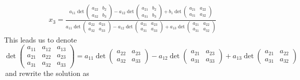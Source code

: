 $$\begin{aligned}
x_3 = \frac{a_{11} \operatorname{det} \begin{pmatrix} a_{22} & b_2 \\ a_{32} & b_3 \end{pmatrix} - a_{12} \operatorname{det} \begin{pmatrix} a_{21} & b_2 \\ a_{31} & b_3 \end{pmatrix} + b_1 \operatorname{det} \begin{pmatrix} a_{21} & a_{22} \\ a_{31} & a_{32} \end{pmatrix}}
           {a_{11} \operatorname{det} \begin{pmatrix} a_{22} & a_{23} \\ a_{32} & a_{33} \end{pmatrix} - a_{12} \operatorname{det} \begin{pmatrix} a_{21} & a_{23} \\ a_{31} & a_{33} \end{pmatrix} + a_{13} \operatorname{det} \begin{pmatrix} a_{21} & a_{22} \\ a_{31} & a_{32} \end{pmatrix}}
\end{aligned}$$
This leads us to denote 
$$\operatorname{det} \begin{pmatrix}
a_{11} & a_{12} & a_{13} \\
a_{21} & a_{22} & a_{23} \\
a_{31} & a_{32} & a_{33}
\end{pmatrix} = a_{11} \operatorname{det} \begin{pmatrix} 
a_{22} & a_{23} \\ 
a_{32} & a_{33} 
\end{pmatrix} - a_{12} \operatorname{det} \begin{pmatrix}
a_{21} & a_{23} \\
a_{31} & a_{33}
\end{pmatrix} + a_{13} \operatorname{det} \begin{pmatrix}
a_{21} & a_{22} \\
a_{31} & a_{32}
\end{pmatrix}
$$
\,and rewrite the solution as
